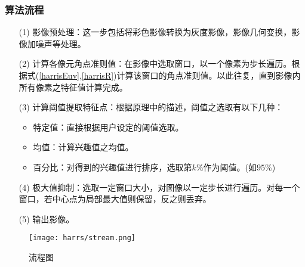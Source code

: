     \subsubsection{算法流程}
    \begin{enumerate}
        \item [(1)]影像预处理：这一步包括将彩色影像转换为灰度影像，影像几何变换，影像加噪声等处理。
        \item [(2)]计算各像元角点准则值：在影像中选取窗口，以一个像素为步长遍历。根据式(\ref{harrisEuv},\ref{harrisR})计算该窗口的角点准则值。以此往复，直到影像内所有像素之特征值计算完成。
        \item [(3)]计算阈值提取特征点：根据原理中的描述，阈值之选取有以下几种：
            \begin{itemize}
                \item 特定值：直接根据用户设定的阈值选取。
                \item 均值：计算兴趣值之均值。
                \item 百分比：对得到的兴趣值进行排序，选取第$k\%$作为阈值。(如$95\%$)
            \end{itemize}
        \item [(4)]极大值抑制：选取一定窗口大小，对图像以一定步长进行遍历。对每一个窗口，若中心点为局部最大值则保留，反之则丢弃。
        \item [(5)]输出影像。
    \end{enumerate}

    \begin{figure}[H]
        \centering 
        \texttt{[image: harrs/stream.png]}
        \caption{流程图}
        \label{harris_stream}
    \end{figure}
    

